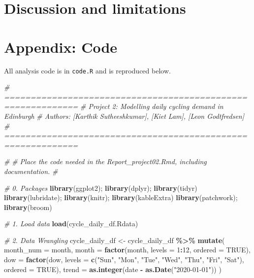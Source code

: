 \documentclass[
]{article}
\newenvironment{Shaded}{\begin{snugshade}}{\end{snugshade}}
\newcommand{\AttributeTok}[1]{\textcolor[rgb]{0.13,0.29,0.53}{#1}}
\newcommand{\CommentTok}[1]{\textcolor[rgb]{0.56,0.35,0.01}{\textit{#1}}}
\newcommand{\ConstantTok}[1]{\textcolor[rgb]{0.56,0.35,0.01}{#1}}
\newcommand{\DecValTok}[1]{\textcolor[rgb]{0.00,0.00,0.81}{#1}}
\newcommand{\FunctionTok}[1]{\textcolor[rgb]{0.13,0.29,0.53}{\textbf{#1}}}
\newcommand{\NormalTok}[1]{#1}
\newcommand{\OtherTok}[1]{\textcolor[rgb]{0.56,0.35,0.01}{#1}}
\newcommand{\SpecialCharTok}[1]{\textcolor[rgb]{0.81,0.36,0.00}{\textbf{#1}}}
\newcommand{\StringTok}[1]{\textcolor[rgb]{0.31,0.60,0.02}{#1}}
\begin{document}
\section{Discussion and limitations}\label{discussion-and-limitations-1}

\section{Appendix: Code}\label{appendix-code}

All analysis code is in \texttt{code.R} and is reproduced below.

\begin{Shaded}
\begin{Highlighting}[]
\CommentTok{\# ============================================================}
\CommentTok{\# Project 2: Modelling daily cycling demand in Edinburgh}
\CommentTok{\# Authors: [Karthik Sutheeshkumar], [Kiet Lam], [Leon Godtfredsen]}
\CommentTok{\# ============================================================}

\CommentTok{\#}
\CommentTok{\# Place the code needed in the Report\_project02.Rmd, including documentation.}
\CommentTok{\#}

\CommentTok{\# 0. Packages}
\FunctionTok{library}\NormalTok{(ggplot2); }\FunctionTok{library}\NormalTok{(dplyr); }\FunctionTok{library}\NormalTok{(tidyr)}
\FunctionTok{library}\NormalTok{(lubridate); }\FunctionTok{library}\NormalTok{(knitr); }\FunctionTok{library}\NormalTok{(kableExtra)}
\FunctionTok{library}\NormalTok{(patchwork); }\FunctionTok{library}\NormalTok{(broom)}

\CommentTok{\# 1. Load data}
\FunctionTok{load}\NormalTok{(}\StringTok{\textquotesingle{}cycle\_daily\_df.Rdata\textquotesingle{}}\NormalTok{)}

\CommentTok{\# 2. Data Wrangling }
\NormalTok{cycle\_daily\_df }\OtherTok{\textless{}{-}}\NormalTok{ cycle\_daily\_df }\SpecialCharTok{\%\textgreater{}\%}
  \FunctionTok{mutate}\NormalTok{(}
    \AttributeTok{month\_num =}\NormalTok{ month,}
    \AttributeTok{month =} \FunctionTok{factor}\NormalTok{(month, }\AttributeTok{levels =} \DecValTok{1}\SpecialCharTok{:}\DecValTok{12}\NormalTok{, }\AttributeTok{ordered =} \ConstantTok{TRUE}\NormalTok{),}
    \AttributeTok{dow =} \FunctionTok{factor}\NormalTok{(dow, }\AttributeTok{levels =} \FunctionTok{c}\NormalTok{(}\StringTok{"Sun"}\NormalTok{, }\StringTok{"Mon"}\NormalTok{, }\StringTok{"Tue"}\NormalTok{, }\StringTok{"Wed"}\NormalTok{, }\StringTok{"Thu"}\NormalTok{, }\StringTok{"Fri"}\NormalTok{, }\StringTok{"Sat"}\NormalTok{),}
                 \AttributeTok{ordered =} \ConstantTok{TRUE}\NormalTok{),}
    \AttributeTok{trend =} \FunctionTok{as.integer}\NormalTok{(date }\SpecialCharTok{{-}} \FunctionTok{as.Date}\NormalTok{(}\StringTok{"2020{-}01{-}01"}\NormalTok{))}
\NormalTok{  )}


\end{Highlighting}
\end{Shaded}
\end{document}
